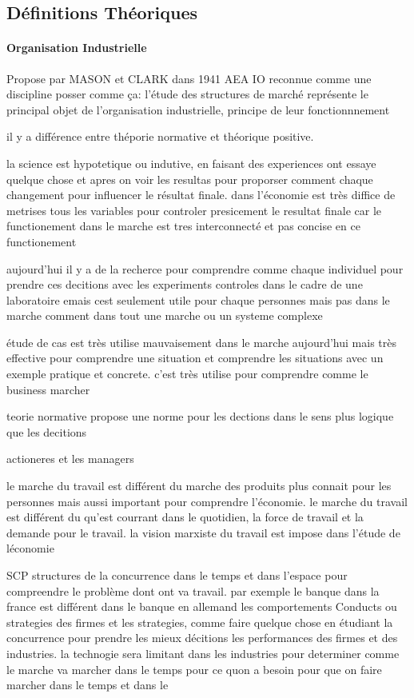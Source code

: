 \documentclass{article}
\begin{document}
\subsection{Définitions Théoriques}
\paragraph{Organisation Industrielle}Propose par MASON et CLARK dans 1941 AEA IO reconnue comme une discipline posser comme ça: l'étude des structures de marché représente le principal objet de l'organisation industrielle, principe de leur fonctionnnement

il y a différence entre théporie normative et théorique positive.

la science est hypotetique ou indutive, en faisant des experiences ont essaye quelque chose et apres on voir les resultas pour proporser comment chaque changement pour influencer le résultat finale. dans l'économie est très diffice de metrises tous les variables pour controler presicement le resultat finale car le functionement dans le marche est tres interconnecté et pas concise en ce functionement

aujourd'hui il y a de la recherce pour comprendre comme chaque individuel pour prendre ces decitions avec les experiments controles dans le cadre de une laboratoire emais cest seulement utile pour chaque personnes mais pas dans le marche comment dans tout une marche ou un systeme complexe

étude de cas est très utilise mauvaisement dans le marche aujourd'hui mais très effective pour comprendre une situation et comprendre les situations avec un exemple pratique et concrete. c'est très utilise pour comprendre comme le business marcher

teorie normative propose une norme pour les dections dans le sens plus logique que les decitions

actioneres et les managers


le marche du travail est différent du marche des produits plus connait pour les personnes mais aussi important pour comprendre l'économie.
le marche du travail est différent du qu'est courrant dans le quotidien, la force de travail et la demande pour le travail. la vision marxiste du travail est impose dans l'étude de léconomie


SCP  
structures de la concurrence
dans le temps et dans l'espace pour compreendre le problème dont ont va travail. par exemple le banque dans la france est différent dans le banque en allemand
les comportements Conducts ou strategies des firmes et 
les strategies, comme faire quelque chose en étudiant la concurrence pour prendre les mieux décitions
les performances des firmes et des industries. 
la technogie  sera limitant dans les industries pour determiner comme le marche va marcher dans le temps pour ce quon a besoin pour que on faire marcher dans le temps et dans le
\end{document}
